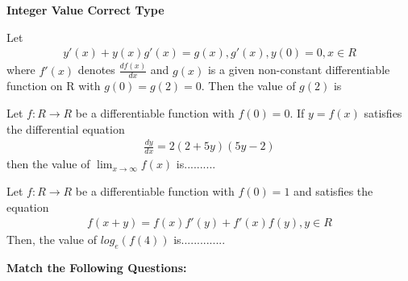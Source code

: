 \textbf{Integer Value Correct Type}

\item Let
\begin{align*}
y'(x) + y(x)g'(x) = g(x), g'(x), y(0) = 0, x \in R 
\end{align*}
where $f'(x)$ denotes $\frac{df(x)}{dx}$ and $g(x)$ is a given non-constant differentiable function on R with $g(0) = g(2) = 0$. Then the value of $g(2)$ is

\item Let $f: R \to R$ be a differentiable function with $f(0) = 0$. If $y = f(x)$ satisfies the differential equation
\begin{align*}
\frac{dy}{dx} = 2(2 + 5y)(5y - 2)
\end{align*}  
then the value of $\lim_{x \to \infty}f(x)$ is..........

\item Let $f: R \to R$ be a differentiable function with $f(0) = 1$ and satisfies the equation 
\begin{align*}
f(x + y) = f(x)f'(y) + f'(x)f(y), y \in R 
\end{align*}
Then, the value of $log_e(f(4))$ is..............

\clearpage

\textbf{Match the Following Questions:}

